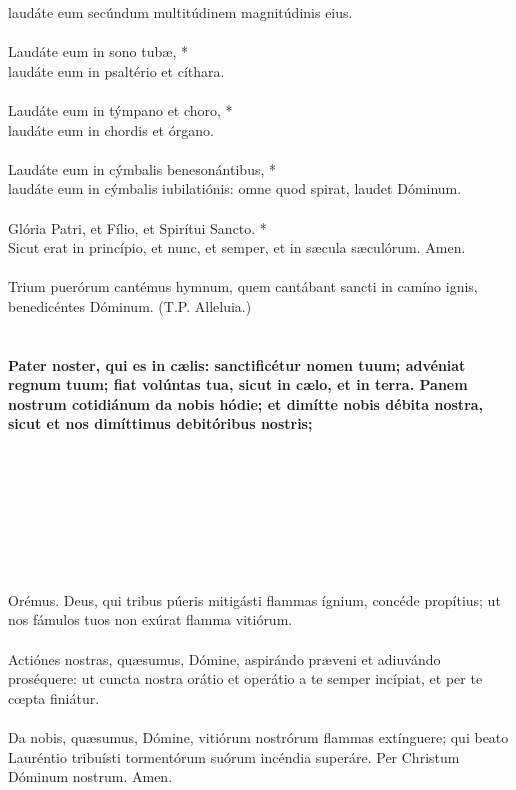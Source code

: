 \documentclass[12pt, a4paper]{article}
\begin{document}
	laudáte eum secúndum
	multitúdinem magnitúdinis eius.
	\\\\
	Laudáte eum in sono tubæ, *\\
	laudáte eum in psaltério et cíthara.
	\\\\
	Laudáte eum in týmpano et choro, *\\
	laudáte eum in chordis et órgano.
	\\\\
	Laudáte eum in cýmbalis
	benesonántibus, *\\
	laudáte eum in
	cýmbalis iubilatiónis: omne quod
	spirat, laudet Dóminum.
	\\\\
	Glória Patri, et Fílio, et Spirítui
	Sancto. *\\
	Sicut erat in princípio, et nunc, et
	semper, et in sæcula sæculórum.
	Amen.
	\\\\
	 Trium puerórum cantémus
	hymnum, quem cantábant sancti in
	camíno ignis, benedicéntes
	Dóminum. (T.P. Alleluia.)
	\\\\
	\\
	\textbf{Pater noster, qui es in cælis:
		sanctificétur nomen tuum; advéniat
		regnum tuum; fiat volúntas tua,
		sicut in cælo, et in terra. Panem
		nostrum cotidiánum da nobis
		hódie; et dimítte nobis débita
		nostra, sicut et nos dimíttimus
		debitóribus nostris;}
	\\\\
	\\
	\\
	\\
	\\
	\\
	\\
	\\
	Orémus. Deus, qui tribus púeris mitigásti
	flammas ígnium, concéde propítius;
	ut nos fámulos tuos non exúrat
	flamma vitiórum.
	\\\\
	Actiónes nostras, quæsumus,
	Dómine, aspirándo præveni et
	adiuvándo proséquere: ut cuncta
	nostra orátio et operátio a te
	semper incípiat, et per te cœpta
	finiátur.
	\\\\
	Da nobis, quæsumus, Dómine,
	vitiórum nostrórum flammas
	extínguere; qui beato Lauréntio
	tribuísti tormentórum suórum
	incéndia superáre. Per Christum
	Dóminum nostrum. Amen.
	
\end{document}
